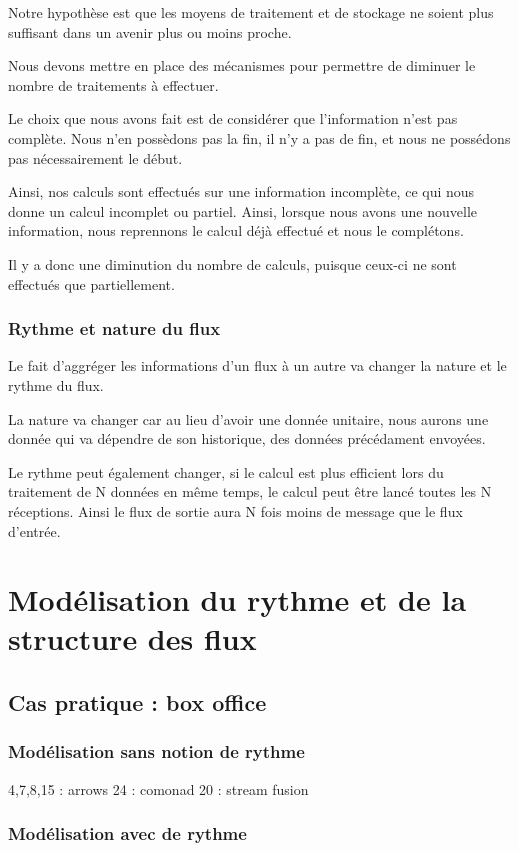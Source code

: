 \documentclass{llncs}
\begin{document}
Notre hypothèse est que les moyens de traitement et de stockage ne soient plus
suffisant dans un avenir plus ou moins proche.

Nous devons mettre en place des mécanismes pour permettre de diminuer le nombre
de traitements à effectuer.

Le choix que nous avons fait est de considérer que l'information n'est pas complète.
Nous n'en possèdons pas la fin, il n'y a pas de fin, et nous ne possédons pas
nécessairement le début.

Ainsi, nos calculs sont effectués sur une information incomplète, ce qui nous
donne un calcul incomplet ou partiel.
Ainsi, lorsque nous avons une nouvelle information, nous reprennons le calcul
déjà effectué et nous le complétons.

Il y a donc une diminution du nombre de calculs, puisque ceux-ci ne sont effectués
que partiellement.

\subsubsection{Rythme et nature du flux}
Le fait d'aggréger les informations d'un flux à un autre va changer la nature et
le rythme du flux.

La nature va changer car au lieu d'avoir une donnée unitaire, nous aurons une
donnée qui va dépendre de son historique, des données précédament envoyées.

Le rythme peut également changer, si le calcul est plus efficient lors du
traitement de N données en même temps, le calcul peut être lancé toutes les N
réceptions.
Ainsi le flux de sortie aura N fois moins de message que le flux d'entrée.

\section{Modélisation du rythme et de la structure des flux}
\subsection{Cas pratique : box office}
\subsubsection{Modélisation sans notion de rythme}
4,7,8,15 : arrows
24 : comonad
20 : stream fusion

\subsubsection{Modélisation avec de rythme}
\end{document}
